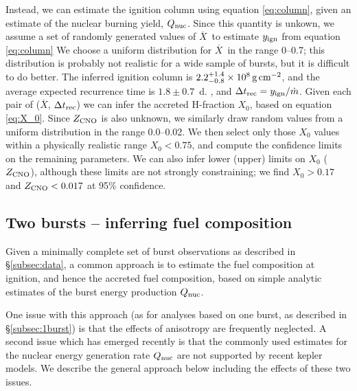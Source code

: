 \documentclass{aastex63}
\newcommand{\Xb}{\ensuremath{\overline{X}}}
\newcommand{\qnuc}{Q_{\rm nuc}}
\newcommand{\yign}{y_{\rm ign}}
\begin{document}
Instead, we can estimate the ignition column using equation \ref{eq:column}, given an estimate of the nuclear burning yield, $\qnuc$. Since this quantity is unkown, we assume a set of randomly generated values of \Xb\
to estimate $\yign$ from equation \ref{eq:column}
%
We choose a uniform distribution for \Xb\ in the range 0--0.7; this distribution is probably not realistic for a wide sample of bursts, but it is difficult to do better.
The inferred ignition column is $2.2_{-0.8}^{+1.4}\times10^8\,{\rm g\,cm^{-2}}$, and the average expected recurrence time is $1.8\pm0.7$~d. 
, and $\Delta t_{\rm rec} = \yign/\dot{m}$.
Given each pair of (\Xb,  $\Delta t_{\rm rec}$) we can infer the accreted H-fraction $X_0$, based on 
equation \ref{eq:X_0}.
%
Since $Z_{\rm CNO}$ is also unknown, we similarly draw random values from a uniform distribution in the range 0.0--0.02.
We then select only those $X_0$ values within a physically realistic range $X_0<0.75$, and compute the confidence limits on the remaining parameters. 
%
We can also infer lower (upper) limits on $X_0$ ($Z_{\rm CNO}$), although these limits are not strongly constraining; we find $X_0>0.17$ and $Z_{\rm  CNO}<0.017$ at 95\% confidence.


\subsection{Two bursts -- inferring fuel composition} 
\label{subsec:fuelcomp}

Given a minimally complete set of burst observations as described in \S\ref{subsec:data}, a common approach \cite[e.g][]{falanga11} is to estimate the fuel composition at ignition, and hence the accreted fuel composition, based on simple analytic estimates of the burst energy production $Q_{\rm nuc}$.

One issue with this approach (as for analyses based on one burst, as described in \S\ref{subsec:1burst}) is that the effects of anisotropy are frequently neglected.
%
A second issue which has emerged recently is that the commonly used estimates for the nuclear energy generation rate $Q_{\rm nuc}$ are not supported by recent {\sc kepler} models. 
%
We describe the general approach below including the effects of these two issues.
\end{document}
